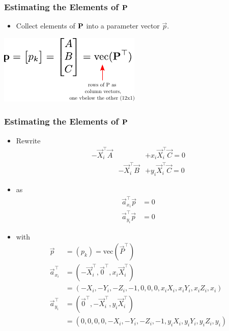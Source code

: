 \begin{frame}
  \frametitle{Estimating the Elements of $\boldsymbol{\mathbf{P}}$}
  \begin{itemize}
    \item Collect elements of $\boldsymbol{\mathbf{P}}$ into a parameter vector $\vec{p}$.
  \end{itemize}

  \begin{center}
    \includegraphics[width=0.5\columnwidth]{./images/projection_matrix_column_vector.pdf}
  \end{center}
  
\end{frame}

\begin{frame}
  \frametitle{Estimating the Elements of $\boldsymbol{\mathbf{P}}$}
  \begin{itemize}
    \item Rewrite
    \begin{equation*}
      \begin{matrix}
        -\vec{X}_{i}^{\top}\vec{A}& &+x_{i}\vec{X}_{i}^{\top}\vec{C} = 0 \\
        &-\vec{X}_{i}^{\top}\vec{B} &+y_{i}\vec{X}_{i}^{\top}\vec{C} = 0
      \end{matrix}  
    \end{equation*}
      
    \item as
    \begin{align*}
        \vec{a}_{x_i}^{\top} \vec{p} &= 0 \\
        \vec{a}_{y_i}^{\top} \vec{p} &= 0
    \end{align*}

     \item with
    \begin{align*}
        \vec{p} &= (p_k) = \text{vec}(\vec{P}^{\top}) \\
        \vec{a}_{x_i}^{\top} &= (-\vec{X}_i^{\top}, \vec{0}^{\top}, x_i \vec{X}_i^{\top}) \\
        &= (-X_i, -Y_i, -Z_i, -1, 0, 0, 0, x_i X_i, x_i Y_i, x_i Z_i, x_i) \\
        \vec{a}_{y_i}^{\top} &= (\vec{0}^{\top}, -\vec{X}_i^{\top}, y_i \vec{X}_i^{\top}) \\
        &= (0, 0, 0, 0, -X_i, -Y_i, -Z_i, -1, y_i X_i, y_i Y_i, y_i Z_i, y_i)
    \end{align*}
  \end{itemize}
\end{frame}

